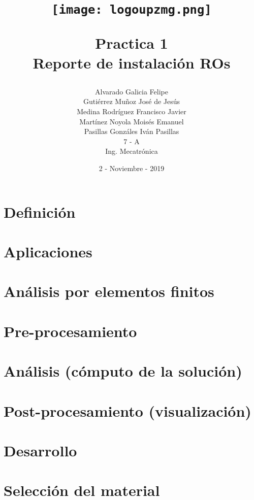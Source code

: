\documentclass[a4paper,10pt]{article}
\title{\begin{center}
\texttt{[image: logoupzmg.png]}
\end{center}
Practica 1 \\ Reporte de instalación ROs}
\author{Alvarado Galicia Felipe \\
Gutiérrez Muñoz José de Jesús \\ 
Medina Rodríguez Francisco Javier \\
Martínez Noyola Moisés Emanuel \\ 
Pasillas Gonzáles Iván Pasillas \\ 
7 - A \\ 
Ing. Mecatrónica}
\date{2 - Noviembre - 2019}
\begin{document}
\maketitle

\break

\tableofcontents

\hfill

\chapter{Definición}

\hfill

\chapter{Aplicaciones}

\hfill

\chapter{Análisis por elementos finitos}

\hfill

\chapter{Pre-procesamiento}

\hfill

\chapter{Análisis (cómputo de la solución)}

\hfill

\chapter{Post-procesamiento (visualización)}

\hfill

\chapter{Desarrollo}

\hfill

\chapter{Selección del material}

\break
\end{document}
